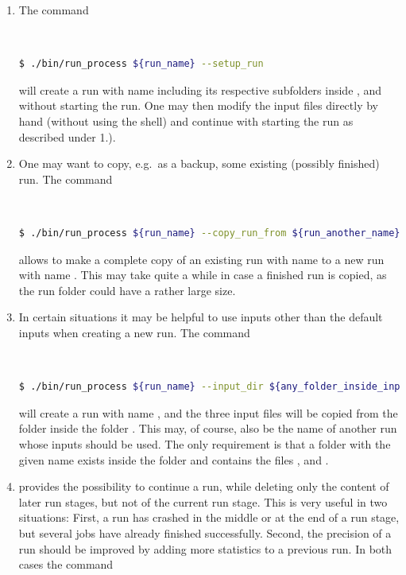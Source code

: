 \documentclass[english,11pt]{article}
\begin{document}
\begin{enumerate}[label={\arabic*.)}]
\item The command
\lstset{basicstyle=\small, frame=none}
{\tt
\begin{lstlisting}[language=bash]
 $ ./bin/run_process ${run_name} --setup_run
\end{lstlisting}
}%
will create a run with name  including its respective 
subfolders inside ,  and 
without starting the run. One may 
then modify the input files directly by hand (without using the \Matrix{} shell) and continue with starting the run as described under 1.).
\item One may want to copy, e.g.\ as a backup, some existing (possibly finished) run. The command
\lstset{basicstyle=\small, frame=none}
{\tt
\begin{lstlisting}[language=bash]
 $ ./bin/run_process ${run_name} --copy_run_from ${run_another_name}
\end{lstlisting}
}%
allows to make a complete copy of an existing run with name  to a new run with name . This 
may take quite a while in case a finished run is copied, as the run folder could have a rather large size.
\item In certain situations it may be helpful to use inputs other than the default inputs when creating a new run. The command
\lstset{basicstyle=\small, frame=none}
{\tt
\begin{lstlisting}[language=bash]
 $ ./bin/run_process ${run_name} --input_dir ${any_folder_inside_input}
\end{lstlisting}
}%
will create a run with name , and the three input files will be copied from the folder  inside 
the folder . This may, of course, also be the name of another run whose inputs should be used. The only requirement is that 
a folder with the given name exists inside the folder  and contains the files ,  and .
\item \Matrix{} provides the possibility to continue a run, while deleting only the content of later run stages, but not of the current run stage. This is very useful in two situations: First, a run has crashed in the middle or at the end of a run stage, but several jobs have already finished successfully. Second, the precision of a run should be improved by adding more statistics to a previous run. In both cases the command

\end{enumerate}
\end{document}

